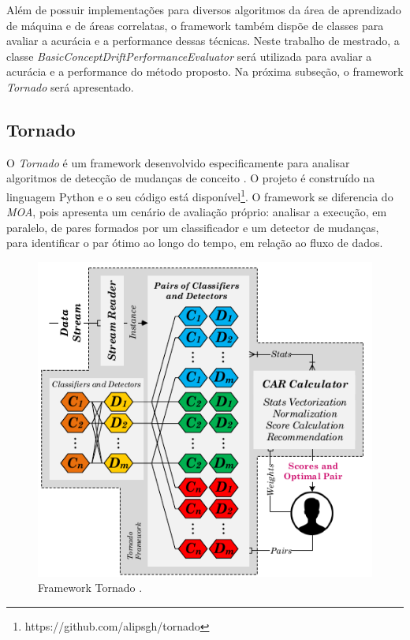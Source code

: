 \documentclass[qual, classic, a4paper]{ufbathesis}
\begin{document}
Além de possuir implementações para diversos algoritmos da área de aprendizado de máquina e de áreas correlatas, o framework também dispõe de classes para avaliar a acurácia e a performance dessas técnicas.
Neste trabalho de mestrado, a classe \textit{BasicConceptDriftPerformanceEvaluator} será utilizada para avaliar a acurácia e a performance do método proposto.
Na próxima subseção, o framework \textit{Tornado} será apresentado.

\subsection{Tornado}

O \textit{Tornado} é um framework desenvolvido especificamente para analisar algoritmos de detecção de mudanças de conceito \cite{Pesaranghader:Tornado}.
O projeto é construído na linguagem Python e o seu código está disponível\footnote{https://github.com/alipsgh/tornado}.
O framework se diferencia do \textit{MOA}, pois apresenta um cenário de avaliação próprio:
analisar a execução, em paralelo, de pares formados por um classificador e um detector de mudanças, 
para identificar o par ótimo ao longo do tempo, em relação ao fluxo de dados.

\begin{figure}[ht]
\begin{center}
    \includegraphics[scale=0.75]{imagens/tornado.png}
    \caption{Framework Tornado \cite{Pesaranghader:Tornado}.}
    \label{fig:tornado}
\end{center}
\end{figure}
\end{document}
